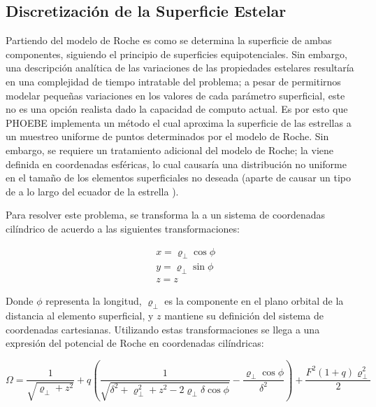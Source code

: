 \subsection{Discretización de la Superficie Estelar}

Partiendo del modelo de Roche es como se determina la superficie de ambas
componentes, siguiendo el principio de superficies equipotenciales. Sin embargo,
una descripción analítica de las variaciones de las propiedades estelares
resultaría en una complejidad de tiempo intratable del problema; a pesar de
permitirnos modelar pequeñas variaciones en los valores de cada parámetro
superficial, este no es una opción realista dado la capacidad de computo actual.
Es por esto que PHOEBE implementa un método el cual aproxima la superficie de
las estrellas a un muestreo uniforme de puntos determinados por el modelo de
Roche. Sin embargo, se requiere un tratamiento adicional del modelo de Roche; la
 viene definida en coordenadas
esféricas, lo cual causaría una distribución no uniforme en el tamaño de los
elementos superficiales no deseada (aparte de causar un tipo de 
a lo largo del ecuador de la estrella ).

Para resolver este problema, se transforma la
 a un sistema de coordenadas
cilíndrico de acuerdo a las siguientes transformaciones:

\begin{eqfloat}[!ht]
	\centering
	\begin{equation}
		\begin{split}
			& x = \varrho_{\perp} \cos{\phi} \\
			& y = \varrho_{\perp} \sin{\phi} \\
			& z = z
		\end{split}
	\end{equation}
\end{eqfloat}

Donde $\phi$ representa la longitud, $\varrho_{\perp}$ es la componente en el
plano orbital de la distancia al elemento superficial, y $z$ mantiene su
definición del sistema de coordenadas cartesianas. Utilizando estas
transformaciones se llega a una expresión del potencial de Roche en coordenadas
cilíndricas:


\begin{eqfloat}[!ht]
	\centering
	\begin{equation}
		\Omega = \frac{1}{\sqrt{\varrho_{\perp} + z^2}} + q \left(\frac{1}{\sqrt{\delta^2 + \varrho_{\perp}^2 + z^2 - 2 \varrho_{\perp} \delta \cos{\phi}}} - \frac{\varrho_{\perp} \cos{\phi}}{\delta^2} \right) + \frac{F^2 \left(1 + q\right) \varrho_{\perp}^2}{2}
	\end{equation}
	\blankcaption
	\label{ecuacionRocheCilindrica}
\end{eqfloat}

